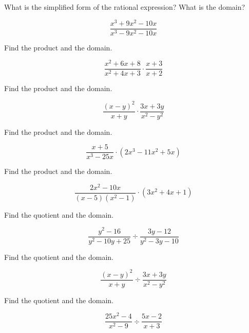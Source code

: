 \documentclass{article}
\newenvironment{practice}[2]{}{}        %
\newcommand{\answer}[1]{}               %
\begin{document}
\begin{practice}{25}{1}
What is the simplified form of the rational expression? What is the domain?

\[
\frac{x^3+9x^2-10x}{x^3-9x^2-10x}
\]
\answer{\(\frac{(x+10)(x-1)}{(x-10)(x+1)}\), \(x\ne -1,0,10\).}
\end{practice}

\begin{practice}{26}{1}
Find the product and the domain.

\[
\frac{x^2+6x+8}{x^2+4x+3}\cdot\frac{x+3}{x+2}
\]
\answer{\(\frac{x+4}{x+1}\) for all \(x\) except \(-3\), \(-2\), and \(-1\).}
\end{practice}

\begin{practice}{27}{1}
Find the product and the domain.

\[
\frac{(x-y)^2}{x+y}\cdot\frac{3x+3y}{x^2-y^2}
\]
\answer{\(\frac{3(x-y)}{x+y}\) for all real numbers except \(x=y\) or \(x=-y\).}
\end{practice}

\begin{practice}{28}{1}
Find the product and the domain.

\[
\frac{x+5}{x^3-25x}\cdot(2x^3-11x^2+5x)
\]
\answer{\(2x-1\) for all \(x\) except \(0\), \(-5\), and \(5\).}
\end{practice}

\begin{practice}{29}{1}
Find the product and the domain.

\[
\frac{2x^2-10x}{(x-5)(x^2-1)}\cdot(3x^2+4x+1)
\]
\answer{\(\frac{2x(3x+1)}{x-1}\) for all \(x\) except \(-1\), \(1\), and \(5\).}
\end{practice}

\begin{practice}{30}{1}
Find the quotient and the domain.

\[
\frac{y^2-16}{y^2-10y+25}\div\frac{3y-12}{y^2-3y-10}
\]
\answer{\(\frac{(y+4)(y+2)}{3(y-5)}\) for all \(y\) except \(4\) and \(5\).}
\end{practice}

\begin{practice}{31}{1}
Find the quotient and the domain.

\[
\frac{(x-y)^2}{x+y}\div\frac{3x+3y}{x^2-y^2}
\]
\answer{\(\frac{(x-y)^3}{3(x+y)}\) for all \(x\) except \(x=-y\).}
\end{practice}

\begin{practice}{32}{1}
Find the quotient and the domain.

\[
\frac{25x^2-4}{x^2-9}\div\frac{5x-2}{x+3}
\]
\answer{\(\frac{5x+2}{x-3}\) for all \(x\) except \(-3\), \(\frac{2}{5}\), and \(3\).}
\end{practice}
\end{document}
